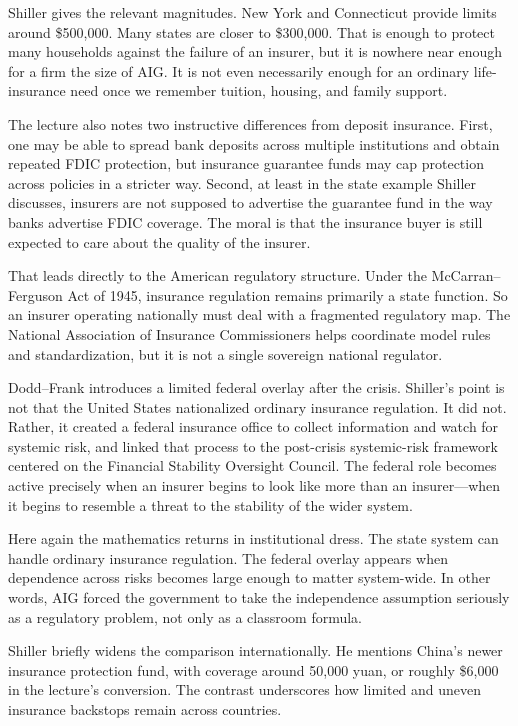 Shiller gives the relevant magnitudes. New York and Connecticut provide limits around \$500{,}000. Many states are closer to \$300{,}000. That is enough to protect many households against the failure of an insurer, but it is nowhere near enough for a firm the size of AIG. It is not even necessarily enough for an ordinary life-insurance need once we remember tuition, housing, and family support.

The lecture also notes two instructive differences from deposit insurance. First, one may be able to spread bank deposits across multiple institutions and obtain repeated FDIC protection, but insurance guarantee funds may cap protection across policies in a stricter way. Second, at least in the state example Shiller discusses, insurers are not supposed to advertise the guarantee fund in the way banks advertise FDIC coverage. The moral is that the insurance buyer is still expected to care about the quality of the insurer.

That leads directly to the American regulatory structure. Under the McCarran--Ferguson Act of 1945, insurance regulation remains primarily a state function. So an insurer operating nationally must deal with a fragmented regulatory map. The National Association of Insurance Commissioners helps coordinate model rules and standardization, but it is not a single sovereign national regulator.

Dodd--Frank introduces a limited federal overlay after the crisis. Shiller's point is not that the United States nationalized ordinary insurance regulation. It did not. Rather, it created a federal insurance office to collect information and watch for systemic risk, and linked that process to the post-crisis systemic-risk framework centered on the Financial Stability Oversight Council. The federal role becomes active precisely when an insurer begins to look like more than an insurer---when it begins to resemble a threat to the stability of the wider system.

Here again the mathematics returns in institutional dress. The state system can handle ordinary insurance regulation. The federal overlay appears when dependence across risks becomes large enough to matter system-wide. In other words, AIG forced the government to take the independence assumption seriously as a regulatory problem, not only as a classroom formula.

Shiller briefly widens the comparison internationally. He mentions China's newer insurance protection fund, with coverage around 50{,}000 yuan, or roughly \$6{,}000 in the lecture's conversion. The contrast underscores how limited and uneven insurance backstops remain across countries.

